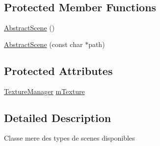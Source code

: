 \subsection*{Protected Member Functions}
\begin{DoxyCompactItemize}
\item 
\hyperlink{class_abstract_scene_ae4b1176cfbb35e9ffc3b7021d3274cc4}{Abstract\+Scene} ()
\item 
\hyperlink{class_abstract_scene_a6f42922b5dc67eb56aeb2246c39c02ae}{Abstract\+Scene} (const char $\ast$path)
\end{DoxyCompactItemize}
\subsection*{Protected Attributes}
\begin{DoxyCompactItemize}
\item 
\hyperlink{struct_texture_manager}{Texture\+Manager} \hyperlink{class_abstract_scene_af5c8041d61ff5700c02e365345c06f67}{m\+Texture}
\end{DoxyCompactItemize}


\subsection{Detailed Description}
Classe mere des types de scenes disponibles 

